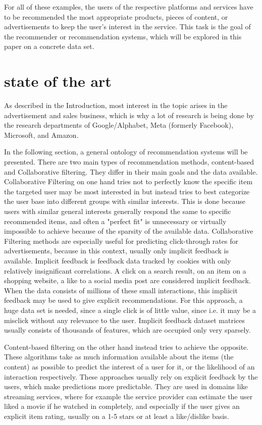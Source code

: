 \documentclass[10pt,final,journal,a4paper,oneside,twocolumn]{IEEEtran}
\begin{document}
For all of these examples, the users of the respective platforms and services have to be recommended the most appropriate products, pieces of content, or advertisements to keep the user's interest in the service. This task is the goal of the recommender or recommendation systems, which will be explored in this paper on a concrete data set.

\section{state of the art}
As described in the Introduction, most interest in the topic arises in the advertisement and sales business, which is why a lot of research is being done by the research departments of Google/Alphabet, Meta (formerly Facebook), Microsoft, and Amazon.

In the following section, a general ontology of recommendation systems will be presented.
There are two main types of recommendation methods, content-based and Collaborative filtering. They differ in their main goals and the data available. 
Collaborative Filtering on one hand tries not to perfectly know the specific item the targeted user may be most interested in but instead tries to best categorize the user base into different groups with similar interests. This is done because users with similar general interests generally respond the same to specific recommended items, and often a "perfect fit" is unnecessary or virtually impossible to achieve because of the sparsity of the available data.
Collaborative Filtering methods are especially useful for predicting click-through rates for advertisements, because in this context, usually only implicit feedback is available. Implicit feedback is feedback data tracked by cookies with only relatively insignificant correlations. A click on a search result, on an item on a shopping website, a like to a social media post are considered implicit feedback.  When the data consists of millions of these small interactions, this impliicit feedback may be used to give explicit recommendations. For this approach, a huge data set is needed, since a single click is of little value, since i.e. it may be a misclick without any relevance to the user. Implicit feedback dataset matrices usually consists of thousands of features, which are occupied only very sparsely.



Content-based filtering on the other hand instead tries to achieve the opposite. These algorithms take as much information available about the items (the content) as possible to predict the interest of a user for it, or the likelihood of an interaction respectively. These approaches usually rely on explicit feedback by the users, which make predictions more predictable. They are used in domains like streaming services, where for example the service provider can estimate the user liked a movie if he watched in completely, and especially if the user gives an explicit item rating, usually on a 1-5 stars or at least a like/dislike basis.
\end{document}
